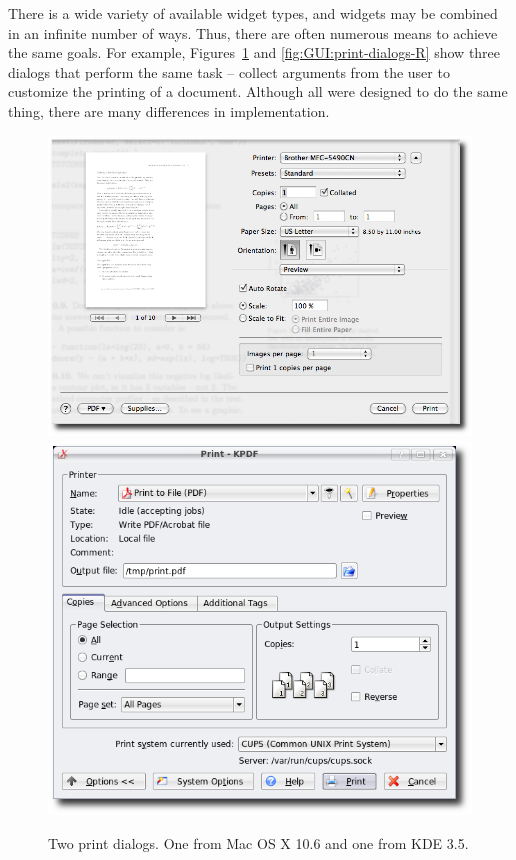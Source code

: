 There is a wide variety of available widget types, and widgets may be
combined in an infinite number of ways. Thus, there are often numerous
means to achieve the same goals. For example,
Figures~\ref{fig:GUI:print-dialogs} and \ref{fig:GUI:print-dialogs-R} show three dialogs that perform
the same task -- collect arguments from the user to customize the
printing of a document. Although all were designed to do the same
thing, there are many differences in implementation.



\begin{figure}
  \centering
  \includegraphics[width=.75\textwidth]{fig-mac-print}
   \\
   
  \includegraphics[width=.75\textwidth]{kde-print}
  \caption{Two print dialogs. One from Mac OS X 10.6 and one from KDE 3.5.}
  \label{fig:GUI:print-dialogs}
\end{figure}


